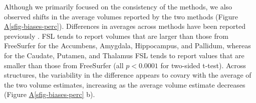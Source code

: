 \documentclass[
  authoryear,
  preprint,
  1p]{elsarticle}
\newcommand*\quartosfigref[1]{Figure \hyperref[#1]{A\ref{#1}}}
\begin{document}
Although we primarily focused on the consistency of the methods, we also
observed shifts in the average volumes reported by the two methods
(\quartosfigref{sfig-biases-perc}). Differences in averages across
methods have been reported previously
\citep{gomez-ramirez2022, perlaki2017, dewey2010, huizinga_differences_2021}.
FSL tends to report volumes that are larger than those from FreeSurfer
for the Accumbens, Amygdala, Hippocampus, and Pallidum, whereas for the
Caudate, Putamen, and Thalamus FSL tends to report values that are
smaller than those from FreeSurfer (all \(p < 0.0001\) for two-sided
t-test). Across structures, the variability in the difference appears to
covary with the average of the two volume estimates, increasing as the
average volume estimate decreases (\quartosfigref{sfig-biases-perc} b).

\begin{sfig}


\caption{\label{sfig-biases-perc}Bland-Altman Plots for Subcortical
Volume. Horizontal lines show average difference and limits of agreement
(1.96 standard deviations), with ribbons marking 95\% confidence
intervals. Panels correspond to subcortical structures. Left and right
structures are plotted together. Shifts in the average estimate
correspond to the central ribbon excluding zero. The color overlay
indicates the degree of overplotting. a) Raw Differences. Note that axes
are across panels independently. b) Differences by Percent Average.}

\end{sfig}%
\end{document}
